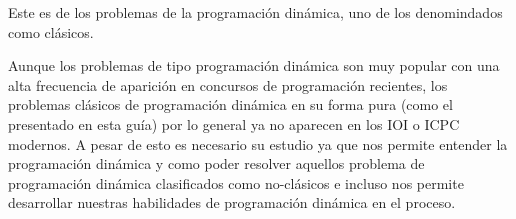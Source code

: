 Este es de los problemas de la programación dinámica, uno de los denomindados como clásicos. 

Aunque los problemas de tipo programación dinámica son muy popular con una alta frecuencia de aparición en concursos de programación
recientes, los problemas clásicos de programación dinámica en su forma pura (como el presentado en esta guía) por lo general ya no aparecen en los IOI o ICPC modernos. A pesar de esto es necesario su estudio ya
que nos permite entender la programación dinámica y como poder resolver aquellos problema de programación dinámica clasificados como no-clásicos e incluso nos permite desarrollar nuestras habilidades de programación
dinámica en el proceso.